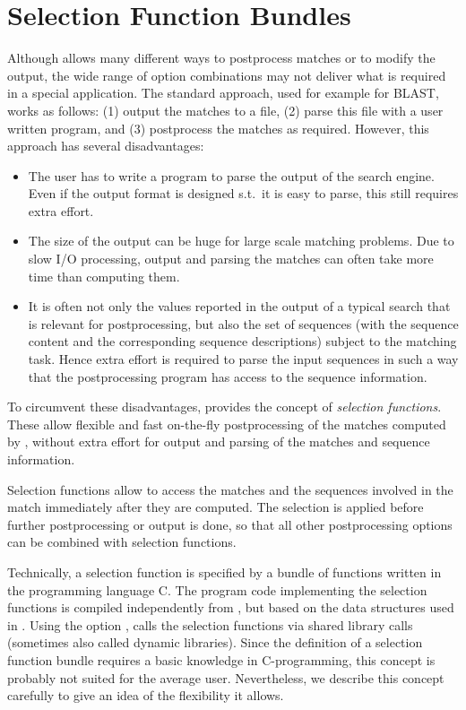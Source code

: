 \documentclass[12pt,titlepage]{article}
\begin{document}
\section{Selection Function Bundles}\label{SelectionConcept}
Although \VM allows many different ways to postprocess matches or to 
modify the output, the wide range of option combinations may
not deliver what is required in a special application.
The standard approach, used for example for BLAST, 
works as follows:
(1) output the matches to a file, (2) parse this file with a user 
written program, and (3) postprocess the matches as required. 
However, this approach has several disadvantages:
\begin{itemize}
\item
The user has to write a program to parse the output of the search
engine. Even if the output format is designed s.t.\ it is easy to
parse, this still requires extra effort.
\item
The size of the output can be huge for large scale matching problems.
Due to slow I/O processing, output and parsing the matches can 
often take more time than computing them.
\item
It is often not only the values reported in the output of a 
typical search that is relevant for postprocessing, but also the set of
sequences (with the sequence content and the corresponding sequence 
descriptions) subject to the matching task. Hence extra effort is
required to parse the input sequences in such a way that the 
postprocessing program has access to the sequence information.
\end{itemize}

To circumvent these disadvantages, \VM provides the 
concept of \emph{selection functions}. These allow
flexible and fast on-the-fly postprocessing of the matches computed by 
\VM, without extra effort for output and parsing of the matches 
and sequence information. 

Selection functions allow to access the matches and the sequences
involved in the match immediately after they are computed. The
selection is applied before further postprocessing or output
is done, so that all other postprocessing options can be combined
with selection functions.

Technically, a selection
function is specified by a bundle of functions written in the programming
language C. The program code implementing the selection functions
is compiled independently from \VM, but based on the data structures 
used in \VM. Using the option , \VM calls the 
selection functions via shared library calls (sometimes also called dynamic 
libraries). Since the definition of a selection function bundle requires a 
basic knowledge in C-programming, this concept is probably not suited
for the average user. Nevertheless, we describe this concept 
carefully to give an idea of the flexibility it allows.
\end{document}
